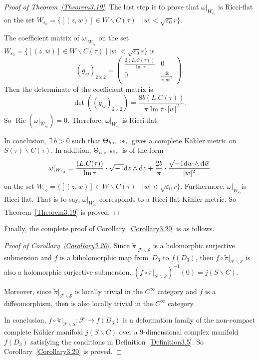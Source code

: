 \documentclass[pdftex]{sigma}
\numberwithin{equation}{section}
\begin{document}
\begin{proof}[Proof of Theorem~\ref{Theorem3.19}]
The last step is to prove that $\omega|_{W_{\varepsilon_0}}$ is Ricci-flat on the set $W_{\varepsilon_0}=\{ [(z,w)]\in W \backslash C(\tau)\mid |w|<\sqrt{\varepsilon_0}r \}$.

The coefficient matrix of $\omega|_{W_{\varepsilon_0}}$ on the set $W_{\varepsilon_0}=\{ [(z,w)]\in W \backslash C(\tau)\mid |w|<\sqrt{\varepsilon_0}r \}$ is \[(g_{ij})_{2 \times 2}= \begin{pmatrix}
 \frac{2 (L.C(\tau))}{\operatorname{ Im}\tau} &0\\
 0 & \frac{4b}{\pi |w|^2}
\end{pmatrix}.\]
Then the determinate of the coefficient matrix is
\[\det((g_{ij})_{2\times 2})=\frac{8b (L.C(\tau))}{\pi \operatorname{ Im}\tau \cdot |w|^2}.\]
So $\operatorname{Ric}(\omega|_{W_{\varepsilon_0}})=0$. Therefore, $\omega|_{W_{\varepsilon_0}}$ is Ricci-flat.

In conclusion, $\exists \ b>0$ such that $\Theta_{h\cdot {\rm e}^{-b\Psi_s}}$ gives a complete K\"ahler metric on $S(\tau)\backslash C(\tau)$. In addition, $\Theta_{h\cdot {\rm e}^{-b\Psi_s}}$ is of the form
\[
\omega|_{W_{\varepsilon_0}}=\frac{(L.C(\tau))}{\operatorname{ Im}\tau}\cdot \sqrt{-1} {\rm d}z \wedge {\rm d} \bar{z}+\frac{2b}{\pi} \cdot \frac{\sqrt{-1}{\rm d}w \wedge {\rm d} \bar{w}}{|w|^2}
\]
on the set $W_{\varepsilon_0}=\{[(z,w)]\in W \backslash C(\tau)\mid |w|<\sqrt{\varepsilon_0}r\}$. Furthermore, $\omega|_{W_{\varepsilon_0}}$is Ricci-flat. That is to say, $\omega|_{W_{\varepsilon_0}}$ corresponds to a Ricci-flat K\"ahler metric. So Theorem~\ref{Theorem3.19} is proved.
\end{proof}

Finally, the complete proof of Corollary~\ref{Corollary3.20} is as follows.

\begin{proof}[Proof of Corollary~\ref{Corollary3.20}]
Since $\widetilde{\pi}|_{\mathcal{F}\backslash \mathcal{S}}$ is a holomorphic surjective submersion and $f$ is a biholomorphic map from~$D_3$ to $f(D_3)$, then $f \circ \widetilde{\pi}|_{\mathcal{F}\backslash \mathcal{S}}$ is also a holomorphic surjective submersion. $(f \circ \widetilde{\pi}|_{\mathcal{F}\backslash \mathcal{S}})^{-1}(0)=j(S\backslash C)$.

Moreover, since $\widetilde{\pi}|_{\mathcal{F}\backslash \mathcal{S}}$ is locally trivial in the $C^\infty$ category and $f$ is a diffeomorphism, then  is also locally trivial in the $C^\infty$ category.

In conclusion, $f \circ \widetilde{\pi}|_{\mathcal{F}\backslash \mathcal{S}}\colon \mathcal{F} \rightarrow f(D_3)$ is a deformation family of the non-compact complete K\"ahler manifold $j(S\backslash C)$ over a 9-dimensional complex manifold $f(D_3)$ satisfying the conditions in Definition~\ref{Definition3.5}. So Corollary~\ref{Corollary3.20} is proved.
\end{proof}
\end{document}
